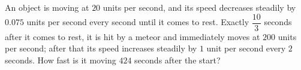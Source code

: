 An object is moving at $20$ units per second, and its speed decreases steadily by $0.075$ units per second every second until it comes to rest. Exactly $\dfrac{10}{3}$ seconds after it comes to rest, it is hit by a meteor and immediately moves at $200$ units per second; after that its speed increases steadily by $1$ unit per second every $2$ seconds. How fast is it moving $424$ seconds after the start?

